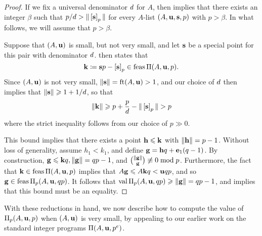 \documentclass{amsart}
\begin{document}
\begin{proof}
   If we fix a universal denominator $d$ for $A$, then  implies that there exists an integer $\beta$ such that $p/d > \| \left[ \mathbf{s} \right]_p \|$ for every $A$-list $(A,\mathbf{u},\mathbf{s}, p)$ with $p > \beta$.
   In what follows, we will assume that $p > \beta$.

   Suppose that $(A,\mathbf{u})$ is small, but not very small, and let $\mathbf{s}$ be a special point for this pair with denominator $d$.
    then states that
   \[ \mathbf{k} \coloneqq \mathbf{s}p-\left[ \mathbf{s} \right]_p \in \operatorname{feas} \Pi(A,\mathbf{u},p). \]
   Since $(A,\mathbf{u})$ is not very small, $\| \mathbf{s} \| = \operatorname{ft}(A, \mathbf{u}) > 1$, and our choice of $d$ then implies that $\| \mathbf{s} \| \geqslant 1 + 1/d$, so that
   \[\| \mathbf{k} \| \geqslant p + \frac{p}{d} - \| \left[ \mathbf{s} \right]_p \| > p\]
   where the strict inequality follows from our choice of $p \gg 0$.

   This bound implies that there exists a point $\mathbf{h} \leqslant \mathbf{k}$ with $\| \mathbf{h} \| = p-1$.
   Without loss of generality, assume $h_1 < k_1$, and define $\mathbf{g} = \mathbf{h}q + \mathbf{e}_1(q-1)$.
   By construction, $\mathbf{g} \leqslant \mathbf{k}q, \| \mathbf{g} \| = qp-1$, and $\binom{\| \mathbf{g} \|}{\mathbf{g}} \not\equiv 0 \bmod p$.
   Furthermore, the fact that $\mathbf{k} \in \operatorname{feas} \Pi(A,\mathbf{u},p)$ implies that $A\mathbf{g} \leqslant A{\mathbf{k}}q < \mathbf{u}qp$, and so $\mathbf{g} \in \operatorname{feas} \Pi_p(A,\mathbf{u},qp)$.
   It follows that $\operatorname{val} \Pi_p(A,\mathbf{u},qp) \geqslant \| \mathbf{g} \| = qp-1$, and  implies that this bound must be an equality.
\end{proof}

With these reductions in hand, we now describe how to compute the value of $\Pi_p(A, \mathbf{u}, p)$ when $(A, \mathbf{u})$ is very small,  by appealing to our earlier work on the standard integer programs $\Pi(A, \mathbf{u}, p^e)$.
\end{document}
